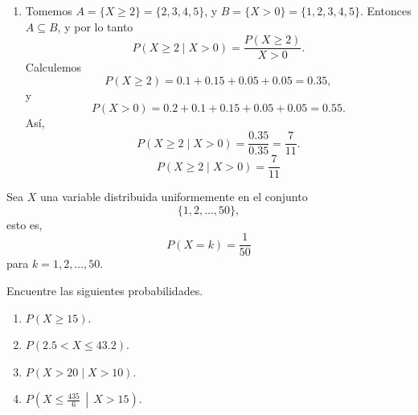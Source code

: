 \documentclass[12pt,a4paper]{article}
\begin{document}
\begin{solucion}
\begin{enumerate}
\begin{equation*}
                P(X=-2\mid X\leq0)=\frac{P(X=-2)}{P(X\leq0)}.
            \end{equation*}
            Ahora,
            \begin{equation*}
                P(X\leq0)=0.1+0.2+0.15=0.45.
            \end{equation*}
            Entonces,
            \begin{equation*}
                P(X=-2\mid X\leq0)=\frac{0.1}{0.45}=\frac{2}{9}.
            \end{equation*}
            \begin{equation*}
                P(X=-2\mid X\leq0)=\frac{2}{9}
            \end{equation*}
            \item[(e)] Tomemos $A=\{X\geq2\}=\{2,3,4,5\}$, y $B=\{X\gt0\}=\{1,2,3,4,5\}$. Entonces $A\subseteq B$,
            y por lo tanto
            \begin{equation*}
                P(X\geq2\mid X\gt0)=\frac{P(X\geq2)}{X\gt0}.
            \end{equation*}
            Calculemos
            \begin{equation*}
                P(X\geq2)=0.1+0.15+0.05+0.05=0.35,
            \end{equation*}
            y
            \begin{equation*}
                P(X\gt0)=0.2+0.1+0.15+0.05+0.05=0.55.
            \end{equation*}
            Así,
            \begin{equation*}
                P(X\geq2\mid X\gt0)=\frac{0.35}{0.35}=\frac{7}{11}.
            \end{equation*}
            \begin{equation*}
                P(X\geq2\mid X\gt0)=\frac{7}{11}
            \end{equation*}
        \end{enumerate}
    \end{solucion}

    \begin{mdframed}[style=mdpinkbox,frametitle={Ejercicio 6}]
        Sea $X$ una variable distribuida uniformemente en el conjunto
        \[
        \{1,2,\ldots,50\},
        \]
        esto es,
        \[
        P(X=k)=\frac{1}{50}
        \]
        para $k=1,2,\ldots,50$.

        Encuentre las siguientes probabilidades.

        \begin{enumerate}
            \item[(a)] $P(X\geq 15)$.
            \item[(b)] $P(2.5<X\leq 43.2)$.
            \item[(c)] $P(X>20\mid X>10)$.
            \item[(d)] $P\left(X\leq \frac{435}{6}\,\middle|\,X>15\right)$.
        \end{enumerate}
    \end{mdframed}
\end{document}
